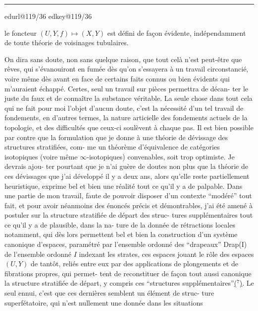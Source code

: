 \documentclass[11pt,a4paper]{article}
\makeatletter
\newif\ifdiplomatic
\newif\ifreading
\def\CurrentScanURL{}
\def\CurrentPageKey{}
\def\CurrentApparatus{}
\newcounter{appnote}
\newcommand{\scanpage}[1]{%
  \clearpage
  \expandafter\let\expandafter\CurrentScanURL\csname edurl@#1\endcsname
  \expandafter\let\expandafter\CurrentPageKey\csname edkey@#1\endcsname
  \def\CurrentApparatus{}%
  \hypertarget{scan-\CurrentPageKey}{}%
  \typeout{EDITION-SCAN: \CurrentPageKey; PDFPAGE: \the\numexpr\ReadonlyShipoutCounter+1\relax}%
  \ifreading
    \marginnote{\raggedright\scriptsize\sffamily\href{\CurrentScanURL}{119 / \csname edpage@#1\endcsname}}%
  \else
    \noindent{\small\sffamily\href{\CurrentScanURL}{[scan #1]}}\par\smallskip
  \fi}
\newcommand{\mspage}[1]{%
  \ifreading\marginnote{\raggedright\scriptsize\sffamily p.\,#1}[2\baselineskip]%
  \else\noindent{\small\sffamily[p.\,#1]}\par\smallskip\fi}
\newcommand{\AppItem}[2]{%
  \ifcsdef{edvariant@#2}{%
    \ifcsempty{edvariant@#2}{\PackageError{Esquisse}{Empty apparatus entry #2}{Every executed apparatus marker requires its printed note.}}{}%
  }{\PackageError{Esquisse}{Undefined apparatus entry #2}{Every executed apparatus marker requires its printed note.}}%
  \typeout{EDITION-APP-ENTRY: #2; NUMBER: #1}%
  \par\noindent\textsuperscript{#1}\csname edvariant@#2\endcsname}
\newcommand{\EditionApp}[1]{%
  \stepcounter{appnote}%
  \ifmmode{}^{\scriptscriptstyle\theappnote}\else\textsuperscript{\theappnote}\fi
  \begingroup\edef\x{\endgroup\noexpand\gappto\noexpand\CurrentApparatus{\noexpand\AppItem{\theappnote}{#1}}}\x}
\newcommand{\var}[4]{\ifdiplomatic#1\else#2\ifreading\else\EditionApp{#4}\fi\fi}
\newcommand{\finishscan}{\ifx\CurrentApparatus\empty\else\par\bigskip\noindent\rule{.35\linewidth}{.35pt}\par\smallskip{\footnotesize\setlength{\parskip}{3pt}\CurrentApparatus}\fi}
\newcommand{\notecall}[3]{\hypertarget{#2}{\hyperlink{note-#1}{#3}}}
\makeatother
\begin{document}
\finishscan
\scanpage{119/36}
\mspage{34}

le foncteur  $(U,Y,f) \longmapsto (X,Y)$   est défini de façon évidente,
indépendamment de toute théorie de \var{voisinages tubulaire}{voisinages tubulaires}{slip corrected}{V-FR-036-002}.

On dira sans doute, non sans quelque raison, que tout
celà n'est peut-être que rêves, qui s'évanouiront en fumée dès
qu'on s'essayera à un travail circonstancié, voire même dès avant
en face de certains faits connus ou bien évidents qui m'auraient
échappé. Certes, seul un travail sur pièces permettra de décan-%
ter le juste du faux et de connaître la substance véritable. La
seule chose dans tout cela qui ne fait pour moi l'objet d'aucun
doute, c'est la nécessité d'un tel travail de fondements, en
d'autres termes, la nature articielle des fondements actuels de
la topologie, et des difficultés que ceux-ci soulèvent à chaque
pas. Il est bien possible par contre que la formulation que je
donne à une théorie de dévissage des structures stratifiées, com-%
me un théorème d'équivalence de catégories isotopiques (voire même
$\infty$-isotopiques) convenables, soit trop optimiste. Je devrais ajou-%
ter pourtant que je n'ai guère de doutes non plus que la théorie
de ces dévissages que j'ai développé il y a deux ans, alors qu'elle
reste partiellement heuristique, exprime bel et bien une réalité
tout ce qu'il y a de palpable. Dans une partie de mon travail,
faute de pouvoir disposer d'un contexte ``modéré'' tout fait, et
pour avoir néanmoins des énoncés précis et démontrables, j'ai été
amené à postuler sur la structure stratifiée de départ des struc-%
tures supplémentaires tout ce qu'il y a de plausible, dans la na-%
ture de la donnée de rétractions locales notamment, qui dès lors
permettent bel et bien la construction d'un système canonique
d'espaces, paramétré par l'ensemble ordonné des ``drapeaux'' Drap(I)
de l'ensemble ordonné  $I$  indexant les strates, ces espaces jouant
le rôle des espaces  $(U,Y)$  de tantôt, reliés entre eux par des
applications de plongements et de fibrations propres, qui permet-%
tent de reconstituer \var{de façon toute aussi canonique}{de façon tout aussi canonique}{slip corrected}{V-FR-036-001} la structure
stratifiée de départ, y compris ces ``structures supplémentaires''\notecall{copy1-7}{call-esq_119_036-7-1}{(${}^{7}$)}.
Le seul ennui, c'est que ces dernières semblent un élément de struc-%
ture superfétatoire, qui n'est nullement une donnée dans les situations
\end{document}
